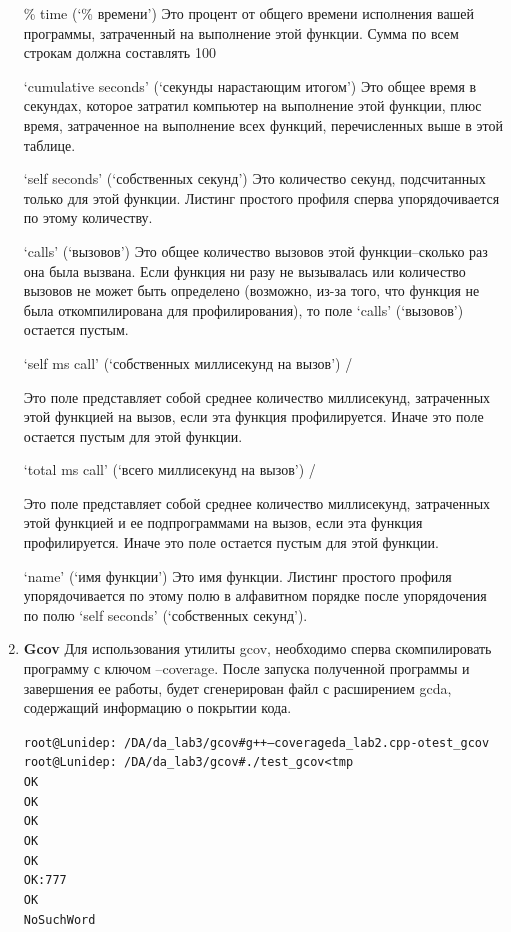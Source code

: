 \begin{enumerate}
    \% time (`\% времени')
    Это процент от общего времени исполнения вашей программы, затраченный на выполнение этой функции. Сумма по всем строкам должна составлять 100%
    
    `cumulative seconds' (`секунды нарастающим итогом')
    Это общее время в секундах, которое затратил компьютер на выполнение этой функции, плюс время, затраченное на выполнение всех функций, перечисленных выше в этой таблице.
    
    `self seconds' (`собственных секунд')
    Это количество секунд, подсчитанных только для этой функции. Листинг простого профиля сперва упорядочивается по этому количеству.
    
    `calls' (`вызовов')
    Это общее количество вызовов этой функции--сколько раз она была вызвана. Если функция ни разу не вызывалась или количество вызовов не может быть определено (возможно, из-за того, что функция не была откомпилирована для профилирования), то поле `calls' (`вызовов') остается пустым.
    
    `self ms
    call' (`собственных миллисекунд на вызов') /
    
    Это поле представляет собой среднее количество миллисекунд, затраченных этой функцией на вызов, если эта функция профилируется. Иначе это поле остается пустым для этой функции.
    
    `total ms
    call' (`всего миллисекунд на вызов') /
    
    Это поле представляет собой среднее количество миллисекунд, затраченных этой функцией и ее подпрограммами на вызов, если эта функция профилируется. Иначе это поле остается пустым для этой функции.
    
    `name' (`имя функции')
    Это имя функции. Листинг простого профиля упорядочивается по этому полю в алфавитном порядке после упорядочения по полю `self seconds' (`собственных секунд').

    
    \item \textbf{Gcov} \newline
    Для использования утилиты gcov, необходимо сперва скомпилировать программу с ключом –coverage. После запуска полученной программы и завершения ее работы, будет сгенерирован файл с расширением gcda, содержащий информацию о покрытии кода.\newline

    \begin{alltt}
    root@Lunidep:~/DA/da_lab3/gcov# g++ --coverage da_lab2.cpp -o test_gcov
    root@Lunidep:~/DA/da_lab3/gcov# ./test_gcov < tmp
    OK
    OK
    OK
    OK
    OK
    OK: 777
    OK
    NoSuchWord
    \end{alltt}
    

\end{enumerate}
